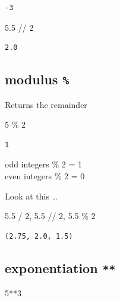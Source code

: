 \documentclass[
  letterpaper,
  DIV=11,
  numbers=noendperiod]{scrreprt}
\newenvironment{Shaded}{\begin{snugshade}}{\end{snugshade}}
\newcommand{\DecValTok}[1]{\textcolor[rgb]{0.68,0.00,0.00}{#1}}
\newcommand{\FloatTok}[1]{\textcolor[rgb]{0.68,0.00,0.00}{#1}}
\newcommand{\NormalTok}[1]{\textcolor[rgb]{0.00,0.23,0.31}{#1}}
\newcommand{\OperatorTok}[1]{\textcolor[rgb]{0.37,0.37,0.37}{#1}}
\begin{document}
\begin{verbatim}
-3
\end{verbatim}

\begin{Shaded}
\begin{Highlighting}[]
\FloatTok{5.5} \OperatorTok{//} \DecValTok{2}
\end{Highlighting}
\end{Shaded}

\begin{verbatim}
2.0
\end{verbatim}

\hypertarget{modulus}{%
\subsection{\texorpdfstring{modulus
\texttt{\%}}{modulus \%}}\label{modulus}}

Returns the remainder

\begin{Shaded}
\begin{Highlighting}[]
\DecValTok{5} \OperatorTok{\%} \DecValTok{2}
\end{Highlighting}
\end{Shaded}

\begin{verbatim}
1
\end{verbatim}

odd integers \% 2 = 1\\
even integers \% 2 = 0

Look at this \ldots{}

\begin{Shaded}
\begin{Highlighting}[]
\FloatTok{5.5} \OperatorTok{/} \DecValTok{2}\NormalTok{, }\FloatTok{5.5} \OperatorTok{//} \DecValTok{2}\NormalTok{, }\FloatTok{5.5} \OperatorTok{\%} \DecValTok{2}
\end{Highlighting}
\end{Shaded}

\begin{verbatim}
(2.75, 2.0, 1.5)
\end{verbatim}

\hypertarget{exponentiation}{%
\subsection{\texorpdfstring{exponentiation
\texttt{**}}{exponentiation **}}\label{exponentiation}}

\begin{Shaded}
\begin{Highlighting}[]
\DecValTok{5}\OperatorTok{**}\DecValTok{3}
\end{Highlighting}
\end{Shaded}
\end{document}
